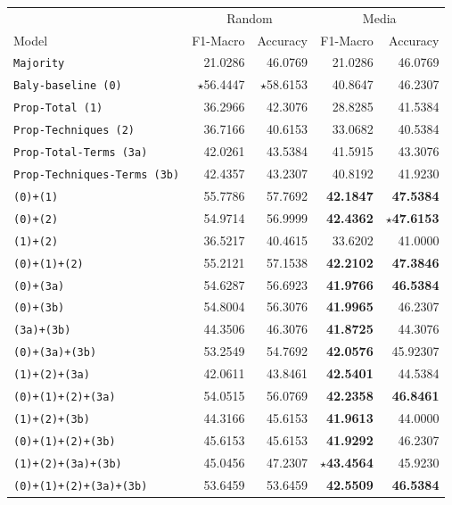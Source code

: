 \begin{table}[!htbp]
    \centering
   \scriptsize
    \begin{tabular}{l|rr|rr}
        & \multicolumn{2}{c}{Random} & \multicolumn{2}{c}{Media} \\
        Model & F1-Macro & Accuracy & F1-Macro & Accuracy \\
        \hline
        \texttt{Majority} & 21.0286 & 46.0769 & 21.0286 & 46.0769 \\
        \texttt{Baly-baseline (0)} & $\star$56.4447 & $\star$58.6153 & 40.8647 & 46.2307 \\
        \hline
        \texttt{Prop-Total (1)} & 36.2966 & 42.3076 & 28.8285 & 41.5384 \\
        \texttt{Prop-Techniques (2)} & 36.7166 & 40.6153 & 33.0682 & 40.5384 \\
        \texttt{Prop-Total-Terms (3a)} & 42.0261 & 43.5384 & 41.5915 & 43.3076 \\
        \texttt{Prop-Techniques-Terms (3b)} & 42.4357 & 43.2307 & 40.8192 & 41.9230 \\
        \hline
        \texttt{(0)+(1)} & 55.7786 & 57.7692 & \textbf{42.1847} & \textbf{47.5384} \\
        \texttt{(0)+(2)} & 54.9714 & 56.9999 & \textbf{42.4362} & \textbf{$\star$47.6153} \\
        \texttt{(1)+(2)} & 36.5217 & 40.4615 & 33.6202 & 41.0000 \\
        \texttt{(0)+(1)+(2)} & 55.2121 & 57.1538 & \textbf{42.2102} & \textbf{47.3846} \\
        \texttt{(0)+(3a)} & 54.6287 & 56.6923 & \textbf{41.9766} & \textbf{46.5384} \\
        \texttt{(0)+(3b)} & 54.8004 & 56.3076 & \textbf{41.9965} & 46.2307 \\
        \texttt{(3a)+(3b)} & 44.3506 & 46.3076 & \textbf{41.8725} & 44.3076 \\
        \texttt{(0)+(3a)+(3b)} & 53.2549 & 54.7692 & \textbf{42.0576} & 45.92307 \\
        \texttt{(1)+(2)+(3a)} & 42.0611 & 43.8461 & \textbf{42.5401} & 44.5384 \\
        \texttt{(0)+(1)+(2)+(3a)} & 54.0515 & 56.0769 & \textbf{42.2358} & \textbf{46.8461} \\
        \texttt{(1)+(2)+(3b)} & 44.3166 & 45.6153 & \textbf{41.9613} & 44.0000 \\
        \texttt{(0)+(1)+(2)+(3b)} & 45.6153 & 45.6153 & \textbf{41.9292} & 46.2307 \\
        \texttt{(1)+(2)+(3a)+(3b)} & 45.0456 & 47.2307 & \textbf{$\star$43.4564} & 45.9230 \\
        \texttt{(0)+(1)+(2)+(3a)+(3b)} & 53.6459 & 53.6459 & \textbf{42.5509} & \textbf{46.5384} \\
        

\end{tabular}
\end{table}
